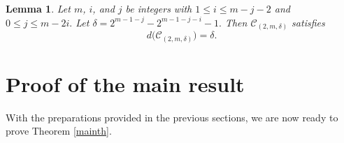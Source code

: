\documentclass[journal,onecolumn]{IEEEtran}
\newtheorem{lemma}{Lemma}
\begin{document}
\begin{lemma}\textnormal{\cite{KasamiLin1972}}\label{kl}
Let $m$, $i$, and $j$  be integers with 
$
1\leq i\leq m-j-2$ and 
$0\leq j\leq m-2i.
$ Let $\delta=2^{m-1-j}-2^{m-1-j-i}-1.
$ 
Then
$\mathcal{C}_{(2,m,\delta)}$ satisfies
\begin{equation*}
d\bigl(\mathcal{C}_{(2,m,\delta)}\bigr)=\delta.
\end{equation*}
\end{lemma}


\section{Proof of the main result}\label{mainresult}


With the  preparations provided in the previous sections, we are now ready to prove Theorem \ref{mainth}. 
\end{document}
